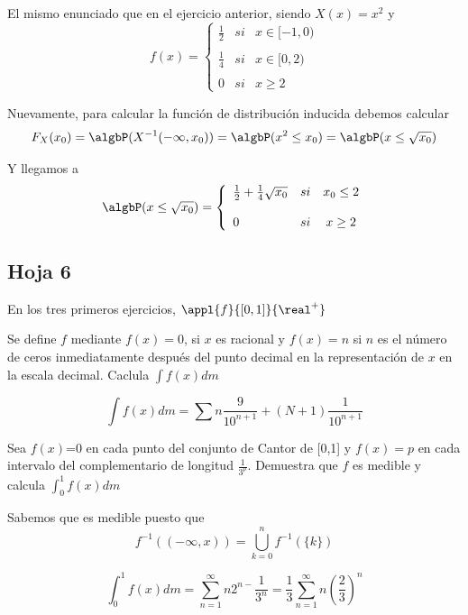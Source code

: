 \begin{problem}[9]
El mismo enunciado que en el ejercicio anterior, siendo $X(x)=x^2$ y
\[
f(x)= \left\{ \begin{array}{lcc}
             \frac{1}{2} &   si  & x \in  [-1, 0) \\
             \\ \frac{1}{4} & si & x \in [0,2) \\
             \\ 0 &  si & x \geq 2
             \end{array}
   \right.
\]

\solution

Nuevamente, para calcular la función de distribución inducida debemos calcular
\[F_X(x_0) = \algbP(X^{-1}(-\infty, x_0)) = \algbP (x^2 \leq x_0) = \algbP (x \leq \sqrt{x_0})\]

Y llegamos a
\[
\algbP (x \leq \sqrt{x_0})= \left\{ \begin{array}{lcc}
              \frac{1}{2} + \frac{1}{4}\sqrt{x_0} & si & x_0 \leq 2 \\
             \\ 0 &  si & x \geq 2
             \end{array}
   \right.
\]
\end{problem}

\subsection{Hoja 6}
En los tres primeros ejercicios, $\appl{f}{[0,1]}{\real^+}$

\begin{problem}[1]
Se define $f$ mediante $f(x) = 0 $, si $x$ es racional y $f(x)=n$ si $n$ es el número de ceros inmediatamente después del punto decimal en la representación de $x$ en la escala decimal. Caclula $\int f(x) dm$

\solution

\[\int f(x) dm = \sum n \frac{9}{10^{n+1}} + (N+1) \frac{1}{10^{n+1}}\]

\end{problem}

\begin{problem}[2]
Sea $f(x)$=0 en cada punto del conjunto de Cantor de [0,1] y $f(x)=p$ en cada intervalo del complementario de longitud $\frac{1}{3^p}$. Demuestra que $f$ es medible y calcula $\int_0^1f(x)dm$

\solution

Sabemos que es medible puesto que
\[f^{-1}((-\infty, x)) = \bigcup_{k=0}^nf^{-1}(\{k\})\]

\[\int_0^1 f(x)dm= \sum_{n=1}^{\infty}n2^{n-}\frac{1}{3^n} = \frac{1}{3}\sum_{n=1}^{\infty} n \left(\frac{2}{3}\right)^n\]
\end{problem}

